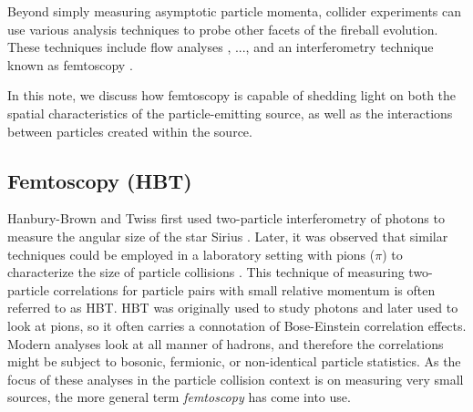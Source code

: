 




% 


Beyond simply measuring asymptotic particle momenta, collider experiments can use various analysis techniques to probe other facets of the fireball evolution.
These techniques include flow analyses \cite{...}, ..., and an interferometry technique known as femtoscopy \cite{...}.




In this note, we discuss how femtoscopy is capable of shedding light on both the spatial characteristics of the particle-emitting source, as well as the interactions between particles created within the source.




\subsection{Femtoscopy (HBT)}
\label{sec:FemtoHBT}
Hanbury-Brown and Twiss first used two-particle interferometry of photons to measure the angular size of the star Sirius \cite{HanburyBrown:1956bqd}.
Later, it was observed that similar techniques could be employed in a laboratory setting with pions ($\pi$) to characterize the size of particle collisions \cite{Goldhaber:1960sf}.
This technique of measuring two-particle correlations for particle pairs with small relative momentum is often referred to as HBT.
HBT was originally used to study photons and later used to look at pions, so it often carries a connotation of Bose-Einstein correlation effects.
Modern analyses look at all manner of hadrons, and therefore the correlations might be subject to bosonic, fermionic, or non-identical particle statistics.
As the focus of these analyses in the particle collision context is on measuring very small sources, the more general term \textit{femtoscopy} has come into use.

